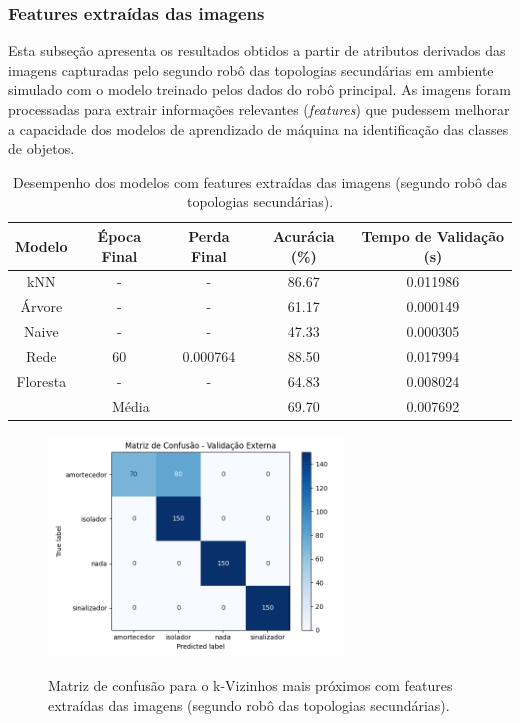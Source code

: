 \subsubsection{Features extraídas das imagens}

Esta subseção apresenta os resultados obtidos a partir de atributos derivados das imagens capturadas pelo segundo robô das topologias secundárias em ambiente simulado com o modelo treinado pelos dados do robô principal. As imagens foram processadas para extrair informações relevantes (\textit{features}) que pudessem melhorar a capacidade dos modelos de aprendizado de máquina na identificação das classes de objetos.

\begin{table}[H]
\caption{Desempenho dos modelos com features extraídas das imagens (segundo robô das topologias secundárias).}
\centering
\begin{tabular}{ccccc}
\hline
\textbf{Modelo} & \textbf{Época Final} & \textbf{Perda Final} & \textbf{Acurácia (\%)} & \textbf{Tempo de Validação (s)}  \\
\hline
kNN      & - & - & 86.67 & 0.011986 \\
Árvore   & - & - & 61.17 & 0.000149 \\
Naive    & - & - & 47.33 & 0.000305 \\
Rede     & 60 & 0.000764 & 88.50 & 0.017994 \\
Floresta & - & - & 64.83 & 0.008024 \\
\hline
\multicolumn{3}{c}{Média} & 69.70 & 0.007692 \\
\hline
\end{tabular}
\fonte{}
\label{tab:modelos_featimg_robo2}
\end{table}


\begin{figure}[H]
\centering
\caption{Matriz de confusão para o k-Vizinhos mais próximos com features extraídas das imagens (segundo robô das topologias secundárias).}
\includegraphics[width=0.7\textwidth]{figuras/Resultados/multi_segundo_Teste3_knn.png}
\label{fig:mc_featimg_knn_robo2_t3}
\fonte{}
\end{figure}


